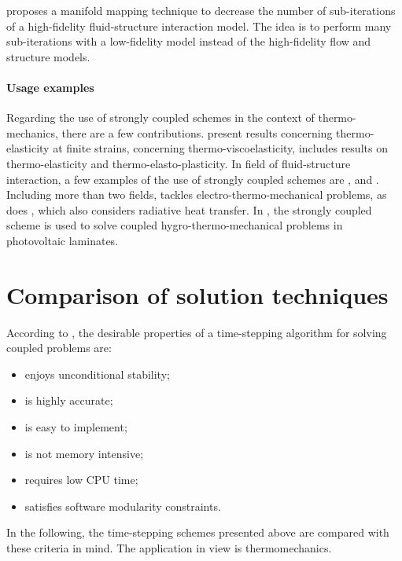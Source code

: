 \cite{blom_efficient_2017} proposes a manifold mapping technique to decrease the number of sub-iterations of a high-fidelity fluid-structure interaction model.
The idea is to perform many sub-iterations with a low-fidelity model instead of the high-fidelity flow and structure models.


\paragraph{Usage examples}

Regarding the use of strongly coupled schemes in the context of thermo-mechanics, there are a few contributions.
\cite{erbts_accelerated_2012} present results concerning thermo-elasticity at finite strains, \cite{netz_high-order_2013} concerning thermo-viscoelasticity, \cite{danowski_computational_2014} includes results on thermo-elasticity and thermo-elasto-plasticity.
In field of fluid-structure interaction, a few examples of the use of strongly coupled schemes are \cite{torii2006computer}, \cite{wall_strong_2007} and \cite{blom_efficient_2017}.
Including more than two fields, \cite{erbts_partitioned_2015} tackles electro-thermo-mechanical problems, as does \cite{wendt_partitioned_2015}, which also considers radiative heat transfer.
In \cite{lenarda_geometrical_2016}, the strongly coupled scheme is used to solve coupled hygro-thermo-mechanical problems in photovoltaic laminates.

\section{Comparison of solution techniques}

According to \cite{felippa_partitioned_1988}, the desirable properties of a time-stepping algorithm for solving coupled problems are:
\begin{itemize}
  \item enjoys unconditional stability;
  \item is highly accurate;
  \item is easy to implement;
  \item is not memory intensive;
  \item requires low CPU time;
  \item satisfies software modularity constraints.
  \end{itemize}
In the following, the time-stepping schemes presented above are compared with these criteria in mind.
The application in view is thermomechanics.

